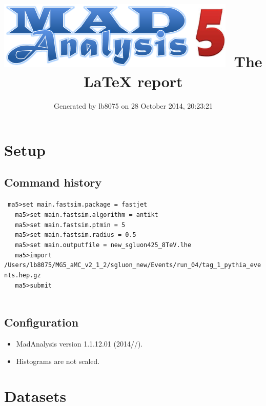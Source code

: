 \documentclass[a4paper, 11pt]{article}
\title{{\includegraphics[scale=.4]{logo.png}}\ The LaTeX report}
\author{Generated by lb8075 on 28 October 2014, 20:23:21}
\begin{document}
\maketitle
\flushbottom

\newpage
\section{ Setup}

\subsection{ Command history}

\texttt{ ma5>set main.fastsim.package = fastjet\\
}
\texttt{ }\texttt{ }\texttt{ ma5>set main.fastsim.algorithm = antikt\\
}
\texttt{ }\texttt{ }\texttt{ ma5>set main.fastsim.ptmin = 5\\
}
\texttt{ }\texttt{ }\texttt{ ma5>set main.fastsim.radius = 0.5\\
}
\texttt{ }\texttt{ }\texttt{ ma5>set main.outputfile = new\_sgluon425\_8TeV.lhe\\
}
\texttt{ }\texttt{ }\texttt{ ma5>import /\-Users/\-lb8075/\-MG5\_aMC\_v2\_1\_2/\-sgluon\_new/\-Events/\-run\_04/\-tag\_1\_pythia\_events.hep.gz\\
}
\texttt{ }\texttt{ }\texttt{ ma5>submit\\
}
\texttt{ }\texttt{ }\subsection{ Configuration}

\begin{itemize}
  \item MadAnalysis version 1.1.12.01 (2014//).
   \item Histograms are not scaled.
 
\end{itemize}
\newpage
\section{ Datasets}
\end{document}
